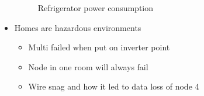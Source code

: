 \documentclass[10pt]{sensys-proc}
\begin{document}
\begin{itemize}
\begin{figure}
       
   
    \caption{Refrigerator power consumption}

    \label{fig:metadata}

\end{figure}

\item Homes are hazardous environments
\begin{itemize}
\item Multi failed when put on inverter point
\item Node in one room will always fail
\item Wire snag and how it led to data loss of node 4
\end{itemize}


\end{itemize}
\end{document}
